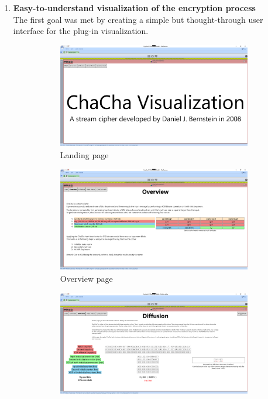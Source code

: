 \begin{enumerate}[label=(\labelenum{G}{{\arabic*}}), wide, labelwidth=!, labelindent=0pt]
\setlength{\parskip}{0pt}
    \item \textbf{Easy-to-understand visualization of the encryption process}\\
    The first goal was met by creating a simple but thought-through user interface for the plug-in visualization.
    
\begin{figure}
\begin{subfigure}{0.85\textwidth}
  \centering
  \includegraphics[width=\textwidth]{figures/ct2/all-pages/1-start.png}
  \caption{Landing page}
  \label{fig:all-pages.landing.page}
\end{subfigure}
\begin{subfigure}{0.85\textwidth}
  \centering
  \includegraphics[width=\textwidth]{figures/ct2/all-pages/2-overview.png}
  \caption{Overview page}
  \label{fig:all-pages.overview.page}
\end{subfigure}
\begin{subfigure}{0.85\textwidth}
  \centering
  \includegraphics[width=\textwidth]{figures/ct2/all-pages/3-diffusion.png}

\end{subfigure}
\end{figure}
\end{enumerate}
